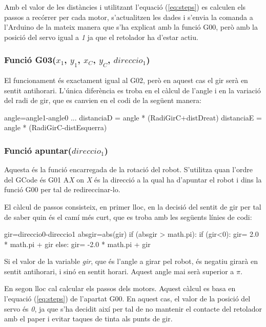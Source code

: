 Amb el valor de les distàncies i utilitzant l’equació (\ref{eq:steps}) es calculen els passos a recórrer per cada motor, s’actualitzen les dades i s’envia la comanda a l’Arduino de la mateix manera que s’ha explicat amb la funció G00, però amb la posició del servo igual a \emph{1} ja que el retolador ha d’estar actiu. 

\subsubsection{Funció G03($x_{1}$, $y_{1}$, $x_{C}$, $y_{C}$, $direccio_{1}$)}
El funcionament és exactament igual al G02, però en aquest cas el gir serà en sentit antihorari. L'única diferència es troba en el càlcul de l’angle i en la variació del radi de gir, que es canvien en el codi de la següent manera: \\


\begin{python}
	angle=angle1-angle0
	...
	distanciaD = angle * (RadiGirC+distDreat) 
	distanciaE = angle * (RadiGirC-distEsquerra)
\end{python}
\subsubsection{Funció apuntar($direccio_{1}$)}\label{apuntar}

Aquesta és la funció encarregada de la rotació del robot. S’utilitza quan l’ordre del GCode és G01 A\emph{X} on \emph{X} és la direcció a la qual ha d’apuntar el robot i dins la funció G00 per tal de redireccinar-lo. 

El càlcul de passos consisteix, en primer lloc, en la decisió del sentit de gir per tal de saber quin és el camí més curt, que es troba amb les següents línies de codi:
\begin{python}
	gir=direccio0-direccio1 
	absgir=abs(gir) 
	if (absgir > math.pi):
		if (gir<0):
			gir= 2.0 * math.pi + gir 
		else:
			gir= -2.0 * math.pi + gir
\end{python}
Si el valor de la variable \emph{gir}, que és l’angle a girar pel robot, és negatiu girarà en sentit antihorari, i sinó en sentit horari. Aquest angle mai serà superior a $\pi$. 

En segon lloc cal calcular els passos dels motors. Aquest càlcul es basa en l’equació (\ref{eq:steps}) de l’apartat G00. En aquest cas, el valor de la posició del servo és \emph{0}, ja que s’ha decidit així per tal de no mantenir el contacte del retolador amb el paper i evitar taques de tinta als punts de gir. 





